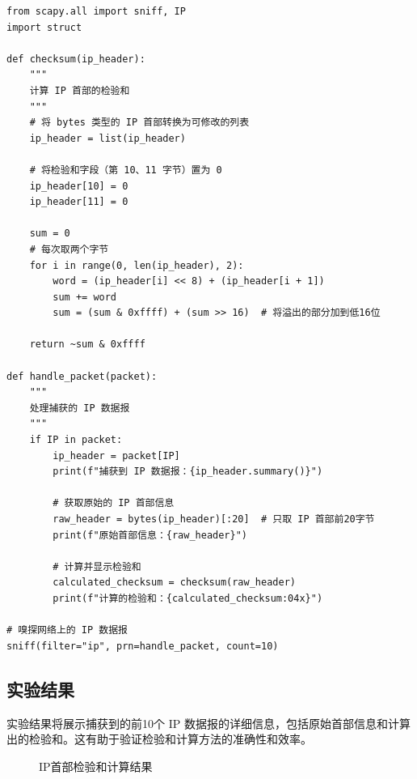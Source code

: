 \documentclass[UTF8,titlepage]{ctexart}
\numberwithin{figure}{section}
\begin{document}
\begin{verbatim}
from scapy.all import sniff, IP
import struct

def checksum(ip_header):
    """
    计算 IP 首部的检验和
    """
    # 将 bytes 类型的 IP 首部转换为可修改的列表
    ip_header = list(ip_header)

    # 将检验和字段（第 10、11 字节）置为 0
    ip_header[10] = 0
    ip_header[11] = 0

    sum = 0
    # 每次取两个字节
    for i in range(0, len(ip_header), 2):
        word = (ip_header[i] << 8) + (ip_header[i + 1])
        sum += word
        sum = (sum & 0xffff) + (sum >> 16)  # 将溢出的部分加到低16位

    return ~sum & 0xffff

def handle_packet(packet):
    """
    处理捕获的 IP 数据报
    """
    if IP in packet:
        ip_header = packet[IP]
        print(f"捕获到 IP 数据报：{ip_header.summary()}")

        # 获取原始的 IP 首部信息
        raw_header = bytes(ip_header)[:20]  # 只取 IP 首部前20字节
        print(f"原始首部信息：{raw_header}")

        # 计算并显示检验和
        calculated_checksum = checksum(raw_header)
        print(f"计算的检验和：{calculated_checksum:04x}")

# 嗅探网络上的 IP 数据报
sniff(filter="ip", prn=handle_packet, count=10)

\end{verbatim}

\subsection{实验结果}
实验结果将展示捕获到的前10个 IP 数据报的详细信息，包括原始首部信息和计算出的检验和。这有助于验证检验和计算方法的准确性和效率。
\begin{figure}[H]
\centering
 \caption{IP首部检验和计算结果}
 \label{}
\end{figure}
\end{document}
